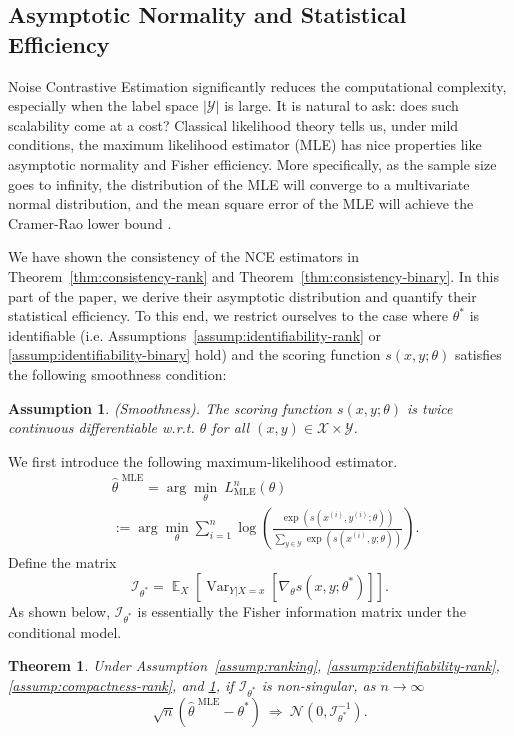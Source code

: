 \documentclass[11pt,a4paper]{article}
\DeclareMathOperator{\E}{\mathbb{E}}
\newcommand{\var}{\operatorname{Var}}
\newcommand{\wh}[1]{\widehat{#1}}
\newcommand{\mle}{\wh{\theta}^{\text{~MLE}}}
\newcommand{\str}[3]{s(#1, #2; #3)}
\newcommand{\fisher}{\mathcal{I}_{\theta^*}}
\newtheorem{theorem}{Theorem}[section]
\newtheorem{assumption}{Assumption}[section]
\begin{document}
\subsection{Asymptotic Normality and Statistical Efficiency}
\label{sec:stat-efficiency}
Noise Contrastive Estimation significantly reduces the computational
complexity, especially when the label space $|\mathcal{Y}|$ is
large. It is natural to ask: does such scalability come at a cost?
Classical likelihood theory tells us, under mild conditions, the
maximum likelihood estimator (MLE) has nice properties like
asymptotic normality and Fisher efficiency. More specifically, as the sample
size goes to infinity, the distribution of the MLE will converge to a
multivariate normal distribution, and the mean square error of the MLE
will achieve the Cramer-Rao lower bound \citep{ferguson1996course}.

We have shown the consistency of the NCE estimators in Theorem~\ref{thm:consistency-rank} and
Theorem~\ref{thm:consistency-binary}. In this part of the paper, we derive their
asymptotic distribution and quantify their statistical efficiency. To
this end, we restrict ourselves to the case where $\theta^*$ is identifiable (i.e. Assumptions~\ref{assump:identifiability-rank} or
\ref{assump:identifiability-binary} hold) and the scoring function $\str{x}{y}{\theta}$ satisfies the following smoothness condition:
\begin{assumption}
  (Smoothness). The scoring function $\str{x}{y}{\theta}$ is twice continuous differentiable w.r.t. $\theta$ for all $(x, y)\in\mathcal{X}\times \mathcal{Y}$. 
  \label{assump:smoothness}
\end{assumption}

We first introduce the following maximum-likelihood estimator. 
\begin{equation*}
\begin{aligned}
& \mle = \arg\min_{\theta}~ L_{\text{MLE}}^n(\theta) \\
& := \arg\min_{\theta}\sum_{i=1}^n \log \left(\frac{\exp(\str{x^{(i)}}{y^{(i)}}{\theta})}{\sum_{y\in\mathcal{Y}}\exp(\str{x^{(i)}}{y}{\theta})}\right). 
\end{aligned}
\end{equation*}
Define the matrix 
\[
\fisher = \E_{X}\left[\var_{Y|X=x}\left[\nabla_{\theta} \str{x}{y}{\theta^*}\right]\right].
\]
As shown below, $\fisher$ is essentially the Fisher information matrix under the conditional model. 
\begin{theorem}
  Under Assumption~\ref{assump:ranking}, \ref{assump:identifiability-rank}, \ref{assump:compactness-rank},  and \ref{assump:smoothness}, if $\fisher$ is non-singular, as $n \rightarrow\infty$
\[
    \sqrt{n}(\mle-\theta^*)~\Rightarrow~\mathcal{N}(0, \fisher^{-1}).
\]
  \label{thm:mle-mse}
  \vspace{-0.5cm}
\end{theorem}
\end{document}
